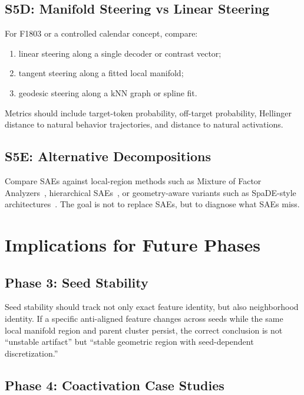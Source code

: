 \documentclass[11pt,a4paper]{article}
\begin{document}
\subsection{S5D: Manifold Steering vs Linear Steering}

For F1803 or a controlled calendar concept, compare:
\begin{enumerate}[noitemsep]
  \item linear steering along a single decoder or contrast vector;
  \item tangent steering along a fitted local manifold;
  \item geodesic steering along a kNN graph or spline fit.
\end{enumerate}
Metrics should include target-token probability, off-target probability, Hellinger distance to natural behavior trajectories, and distance to natural activations.

\subsection{S5E: Alternative Decompositions}

Compare SAEs against local-region methods such as Mixture of Factor Analyzers~\citep{shafran2026regions}, hierarchical SAEs~\citep{muchane2025hierarchical}, or geometry-aware variants such as SpaDE-style architectures~\citep{hindupur2025projecting}. The goal is not to replace SAEs, but to diagnose what SAEs miss.

\section{Implications for Future Phases}
\label{sec:future}

\subsection{Phase 3: Seed Stability}

Seed stability should track not only exact feature identity, but also neighborhood identity. If a specific anti-aligned feature changes across seeds while the same local manifold region and parent cluster persist, the correct conclusion is not ``unstable artifact'' but ``stable geometric region with seed-dependent discretization.''

\subsection{Phase 4: Coactivation Case Studies}
\end{document}
